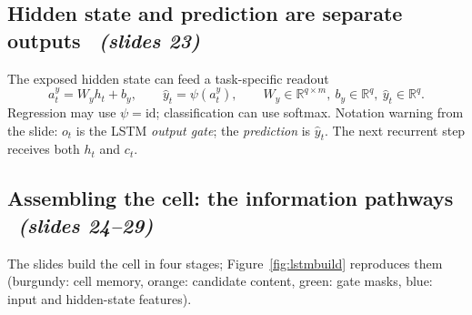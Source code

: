 \documentclass[11pt,a4paper]{article}
\newcommand{\R}{\mathbb{R}}
\newcommand{\sltag}[1]{\texorpdfstring{\ \emph{(slides #1)}}{ (slides #1)}}
\begin{document}
\subsection{Hidden state and prediction are separate outputs \sltag{23}}

The exposed hidden state can feed a task-specific readout
\[
a_t^{y}=W_yh_t+b_y,\qquad\hat y_t=\psi(a_t^{y}),\qquad W_y\in\R^{q\times m},\ b_y\in\R^q,\ \hat y_t\in\R^q .
\]
Regression may use $\psi=\mathrm{id}$; classification can use softmax. Notation warning from the slide: $o_t$ is the LSTM \emph{output gate}; the \emph{prediction} is $\hat y_t$. The next recurrent step receives both $h_t$ and $c_t$.

\subsection{Assembling the cell: the information pathways \sltag{24--29}}

The slides build the cell in four stages; Figure~\ref{fig:lstmbuild} reproduces them (burgundy: cell memory, orange: candidate content, green: gate masks, blue: input and hidden-state features).
\end{document}
